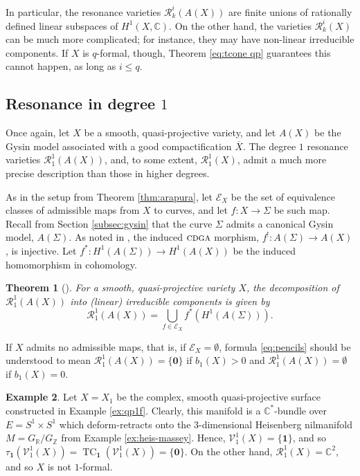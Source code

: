 \documentclass{article}
\numberwithin{equation}{section}
\newtheorem{theorem}{Theorem}[section]
\theoremstyle{definition}
\newtheorem{example}[theorem]{Example}
\newcommand{\Z}{\mathbb{Z}}
\newcommand{\R}{\mathbb{R}}
\renewcommand{\C}{\mathbb{C}}
\newcommand{\VV}{\mathcal{V}}
\newcommand{\RR}{\mathcal{R}}
\newcommand{\cdga}{\ensuremath{\textsc{cdga}}}
\DeclareMathOperator{\TC}{TC}
\newcommand{\one}{\mathbf{1}}
\newcommand{\zero}{\mathbf{0}}
\begin{document}
In particular, the resonance varieties $\RR^i_k(A(X))$ are finite unions of 
rationally defined linear subspaces of $H^1(X,\C)$.  On the other hand, 
the varieties $\RR^i_k(X)$ can be much more complicated; for instance, 
they may have non-linear irreducible components. If $X$ is $q$-formal, 
though, Theorem \ref{eq:tcone qp} guarantees this cannot happen, as 
long as $i\le q$. 

\subsection{Resonance in degree $1$}
\label{subsec:res deg1} 

Once again, let $X$ be a smooth, quasi-projective variety, and 
let $A(X)$ be the Gysin model associated with a good compactification 
$\overline{X}$.  The degree $1$ resonance varieties $\RR^1_1(A(X))$, 
and, to some extent, $\RR^1_1(X)$, admit a much more precise 
description than those in higher degrees.  

As in the setup from Theorem \ref{thm:arapura}, let $\mathcal{E}_X$ 
be the set of equivalence classes of admissible maps from $X$ to 
curves, and let $f\colon X\to \Sigma$ be such map.  Recall 
from Section \ref{subsec:gysin} that the curve $\Sigma$ 
admits a canonical Gysin model, $A (\Sigma)$.  
As noted in  \cite{DP-ccm}, the induced 
$\cdga$ morphism, $f^{!} \colon A(\Sigma) \to A (X)$, 
is injective. Let $f^*\colon H^1(A(\Sigma)) \to H^1(A (X))$ 
be the induced homomorphism in cohomology.

\begin{theorem}[\cite{DP-ccm, MPPS}]
\label{thm:r1 gysin}
For a smooth, quasi-projective variety $X$, 
the decomposition of $\RR^1_1(A(X))$ into (linear) irreducible components 
is given by
\begin{equation}
\label{eq:pencils}
\RR^1_1(A(X))= \bigcup_{f\in \mathcal{E}_X} f^*(H^1(A(\Sigma))).
\end{equation}
\end{theorem}

If $X$ admits no admissible maps, that is, if $\mathcal{E}_X=\emptyset$, 
formula \eqref{eq:pencils} should be understood to mean $\RR^1_1(A(X))= \{\zero\}$ 
if $b_1(X)>0$ and $\RR^1_1(A(X))= \emptyset$ if $b_1(X)=0$.

\begin{example}
\label{ex:heis-complex}
Let $X=X_1$  be the complex, smooth quasi-projective surface 
constructed in Example \ref{ex:qp1f}.  Clearly, this manifold is a 
$\C^*$-bundle over $E=S^1\times S^1$ which deform-retracts 
onto the $3$-dimensional Heisenberg nilmanifold $M=G_{\R}/G_{\Z}$ 
from Example \ref{ex:heis-massey}.  Hence, $\VV^1_1(X)=\{\one\}$, and so 
$\tau_{\one}(\VV^1_1(X))=\TC_{\one}(\VV^1_1(X))=\{\zero\}$.  
On the other hand, $\RR^1_1(X)=\C^2$, and so $X$ is 
not $1$-formal.
\end{example}
\end{document}
